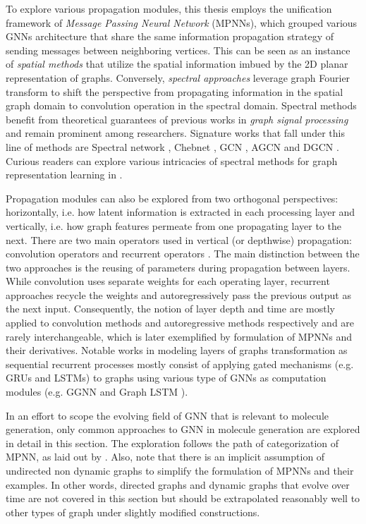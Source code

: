 To explore various propagation modules, this thesis employs the unification
framework of \textit{Message Passing Neural Network} (MPNNs), which grouped
various GNNs architecture that share the same information propagation strategy
of sending messages between neighboring vertices. This can be seen as an
instance of \textit{spatial methods} that utilize the spatial information imbued
by the 2D planar representation of graphs. Conversely, \textit{spectral
approaches} leverage graph Fourier transform to shift the perspective from
propagating information in the spatial graph domain to convolution operation in
the spectral domain. Spectral methods benefit from theoretical guarantees of
previous works in \textit{graph signal processing} and remain prominent among
researchers. Signature works that fall under this line of methods are Spectral
network \citep{brunaSpectralNetworksLocally2014}, Chebnet
\citep{defferrardConvolutionalNeuralNetworks2016}, GCN
\citep{kipfSemiSupervisedClassificationGraph2017}, AGCN
\citep{liAdaptiveGraphConvolutional2018} and DGCN
\citep{zhuangDualGraphConvolutional2018}. Curious readers can explore various
intricacies of spectral methods for graph representation learning in
\citep{zhouGraphNeuralNetworks2020}.

Propagation modules can also be explored from two orthogonal perspectives:
horizontally, i.e. how latent information is extracted in each processing layer
and vertically, i.e. how graph features permeate from one propagating layer to
the next. There are two main operators used in vertical (or depthwise)
propagation: convolution operators and recurrent operators
\citep{wuComprehensiveSurveyGraph2021}. The main distinction between the two
approaches is the reusing of parameters during propagation between layers. While
convolution uses separate weights for each operating layer, recurrent approaches
recycle the weights and autoregressively pass the previous output as the next
input. Consequently, the notion of layer depth and time are mostly applied to
convolution methods and autoregressive methods respectively and are rarely
interchangeable, which is later exemplified by formulation of MPNNs and their
derivatives. Notable works in modeling layers of graphs transformation as
sequential recurrent processes mostly consist of applying gated mechanisms (e.g.
GRUs and LSTMs) to graphs using various type of GNNs as computation modules
(e.g. GGNN \citep{liGatedGraphSequence2017} and Graph LSTM
\citep{zayatsConversationModelingReddit2018}).

In an effort to scope the evolving field of GNN that is relevant to molecule
generation, only common approaches to GNN in molecule generation are explored in
detail in this section. The exploration follows the path of categorization of
MPNN, as laid out by \citep{gilmerNeuralMessagePassing2017}. Also, note that
there is an implicit assumption of undirected non dynamic graphs to simplify the
formulation of MPNNs and their examples. In other words, directed graphs and
dynamic graphs that evolve over time are not covered in this section but should
be extrapolated reasonably well to other types of graph under slightly modified
constructions.

